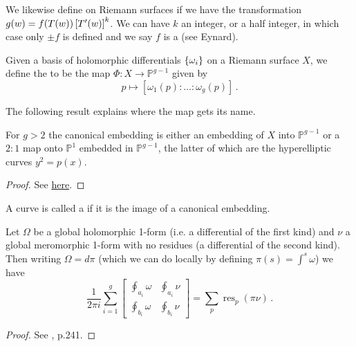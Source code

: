 \documentclass{article}
\begin{document}
\begin{definition}
	We likewise define  on Riemann surfaces if we have the transformation $g(w) = f(T(w)) \left[ T^\prime(w) \right]^k$. We can have $k$ an integer, or a half integer, in which case only $\pm f$ is defined and we say $f$ is a  (see Eynard). 
\end{definition}

\begin{definition}
	Given a basis of holomorphic differentials $\left\{ \omega_i \right\}$ on a Riemann surface $X$, we define the  to be the map $\Phi:X \to \mathbb{P}^{g-1}$ given by 
	\[
	p \mapsto [\omega_1(p): \dots :\omega_g(p)] \, .
	\]
\end{definition}
The following result explains where the map gets its name. 
\begin{theorem}
	For $g>2$ the canonical embedding is either an embedding of $X$ into $\mathbb{P}^{g-1}$ or a $2:1$ map onto $\mathbb{P}^1$ embedded in $\mathbb{P}^{g-1}$, the latter of which are the hyperelliptic curves $y^2=p(x)$. 
\end{theorem}
\begin{proof}
	See \href{https://people.ucsc.edu/~rmont/classes/RiemSurfaces/2013/lectures/Jacobian.pdf}{here}. 
\end{proof}
\begin{definition}
	A curve is called a  if it is the image of a canonical embedding. 
\end{definition}

\begin{prop}
	Let $\Omega$ be a global holomorphic 1-form (i.e. a differential of the first kind) and $\nu$ a global meromorphic 1-form with no residues (a differential of the second kind). Then writing $\Omega = d \pi$ (which we can do locally by defining $\pi(s) = \int^s \omega$) we have 
	\[
	\frac{1}{2\pi i} \sum_{i=1}^g \begin{bmatrix} \oint_{a_i} \omega & \oint_{a_i} \nu \\ \oint_{b_i} \omega & \oint_{b_i} \nu \end{bmatrix} = \sum_p \operatorname{res}_p( \pi \nu) \, .
	\]
\end{prop}
\begin{proof}
	See \cite{Griffiths1985}, p.241.
\end{proof}

\end{document}
